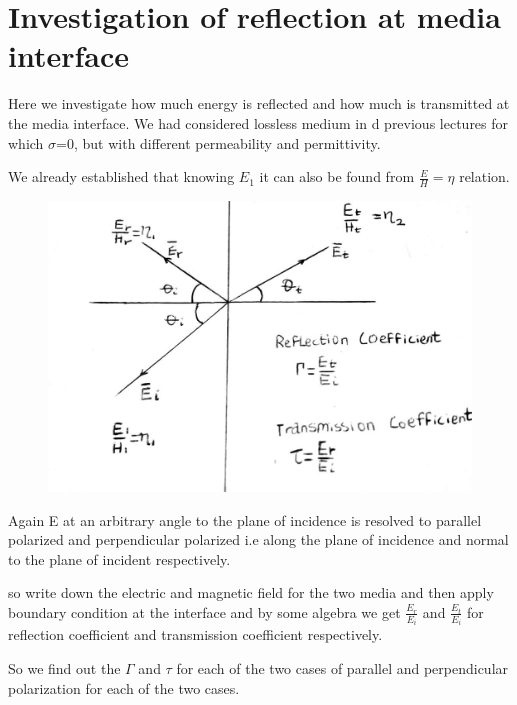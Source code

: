 \chapter{Investigation of reflection at media interface}\label{lec:lec31}
Here we investigate how much energy is reflected and how much is transmitted at the media interface. We had considered lossless medium in d previous lectures for which $ \sigma $=0, but with different permeability and permittivity.

We already established that knowing $E_{1}$ it can also be found from $\frac{E}{H} = \eta$ relation.
\begin{figure}[h]
\centering
\includegraphics[width=1\linewidth]{./graphics/11}
\caption{}
\label{fg:11}
\end{figure}

Again E at an arbitrary angle to the plane of incidence is resolved to parallel polarized and perpendicular polarized i.e along the plane of incidence and normal to the plane of incident respectively.

so write down the electric and magnetic field for the two media and then apply boundary condition at the interface and by some algebra we get $\frac{E_{r}}{E_{i}}$ and $\frac{E_{t}}{E_{i}}$ for reflection coefficient and transmission coefficient respectively.

So we find out the $\Gamma$ and $\tau$ for each of the two cases of parallel and perpendicular polarization for each of the two cases.

